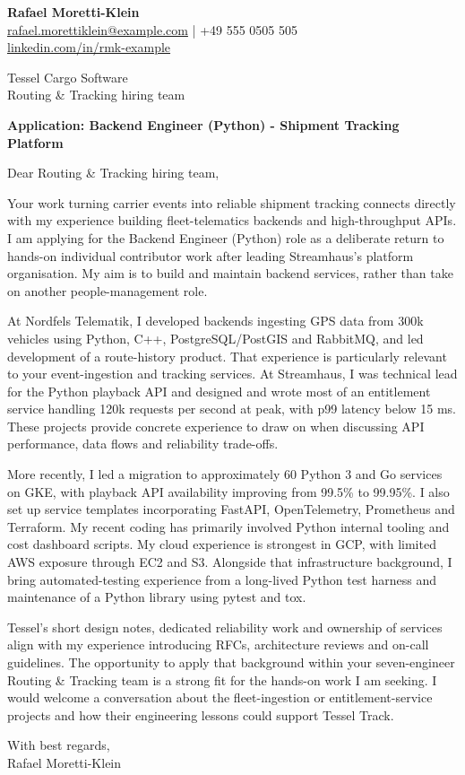 \documentclass[11pt,a4paper]{article}
\begin{document}
{\large\bfseries\color{primarycolor} Rafael Moretti-Klein}\\
\href{mailto:rafael.morettiklein@example.com}{rafael.morettiklein@example.com} | +49 555 0505 505\\
\href{https://linkedin.com/in/rmk-example}{linkedin.com/in/rmk-example}

Tessel Cargo Software\\
Routing \& Tracking hiring team

\textbf{Application: Backend Engineer (Python) - Shipment Tracking Platform}

Dear Routing \& Tracking hiring team,

Your work turning carrier events into reliable shipment tracking connects directly with my experience building fleet-telematics backends and high-throughput APIs. I am applying for the Backend Engineer (Python) role as a deliberate return to hands-on individual contributor work after leading Streamhaus's platform organisation. My aim is to build and maintain backend services, rather than take on another people-management role.

At Nordfels Telematik, I developed backends ingesting GPS data from 300k vehicles using Python, C++, PostgreSQL/PostGIS and RabbitMQ, and led development of a route-history product. That experience is particularly relevant to your event-ingestion and tracking services. At Streamhaus, I was technical lead for the Python playback API and designed and wrote most of an entitlement service handling 120k requests per second at peak, with p99 latency below 15 ms. These projects provide concrete experience to draw on when discussing API performance, data flows and reliability trade-offs.

More recently, I led a migration to approximately 60 Python 3 and Go services on GKE, with playback API availability improving from 99.5\% to 99.95\%. I also set up service templates incorporating FastAPI, OpenTelemetry, Prometheus and Terraform. My recent coding has primarily involved Python internal tooling and cost dashboard scripts. My cloud experience is strongest in GCP, with limited AWS exposure through EC2 and S3. Alongside that infrastructure background, I bring automated-testing experience from a long-lived Python test harness and maintenance of a Python library using pytest and tox.

Tessel's short design notes, dedicated reliability work and ownership of services align with my experience introducing RFCs, architecture reviews and on-call guidelines. The opportunity to apply that background within your seven-engineer Routing \& Tracking team is a strong fit for the hands-on work I am seeking. I would welcome a conversation about the fleet-ingestion or entitlement-service projects and how their engineering lessons could support Tessel Track.

With best regards,\\
Rafael Moretti-Klein
\end{document}
